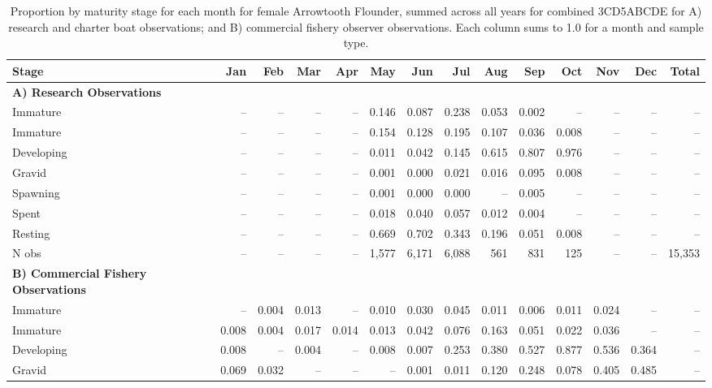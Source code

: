 \begin{table}[b]
\tiny
\centering
\caption{\label{tab:maturityMonth} Proportion by maturity stage for each month for female Arrowtooth Flounder, summed across all years for combined 3CD5ABCDE for A) research and charter boat observations; and B) commercial fishery observer observations. Each column sums to 1.0 for a month and sample type.}
\begin{tabular}{lrrrrrrrrrrrrr}
\hline
Stage      &   Jan &   Feb &   Mar &   Apr &   May &   Jun &   Jul &   Aug &   Sep &   Oct &   Nov &   Dec &  Total \\
\hline
\textbf{A) Research Observations} \\
Immature   &    -- &    -- &    -- &    -- & 0.146 & 0.087 & 0.238 & 0.053 & 0.002 &    -- &    -- &    -- &     -- \\
Immature   &    -- &    -- &    -- &    -- & 0.154 & 0.128 & 0.195 & 0.107 & 0.036 & 0.008 &    -- &    -- &     -- \\
Developing &    -- &    -- &    -- &    -- & 0.011 & 0.042 & 0.145 & 0.615 & 0.807 & 0.976 &    -- &    -- &     -- \\
Gravid     &    -- &    -- &    -- &    -- & 0.001 & 0.000 & 0.021 & 0.016 & 0.095 & 0.008 &    -- &    -- &     -- \\
Spawning   &    -- &    -- &    -- &    -- & 0.001 & 0.000 & 0.000 &    -- & 0.005 &    -- &    -- &    -- &     -- \\
Spent      &    -- &    -- &    -- &    -- & 0.018 & 0.040 & 0.057 & 0.012 & 0.004 &    -- &    -- &    -- &     -- \\
Resting    &    -- &    -- &    -- &    -- & 0.669 & 0.702 & 0.343 & 0.196 & 0.051 & 0.008 &    -- &    -- &     -- \\
N obs      &    -- &    -- &    -- &    -- & 1,577 & 6,171 & 6,088 &   561 &   831 &   125 &    -- &    -- & 15,353 \\
\hline
\textbf{B) Commercial Fishery Observations} \\
Immature   &    -- & 0.004 & 0.013 &    -- & 0.010 & 0.030 & 0.045 & 0.011 & 0.006 & 0.011 & 0.024 &    -- &     -- \\
Immature   & 0.008 & 0.004 & 0.017 & 0.014 & 0.013 & 0.042 & 0.076 & 0.163 & 0.051 & 0.022 & 0.036 &    -- &     -- \\
Developing & 0.008 &    -- & 0.004 &    -- & 0.008 & 0.007 & 0.253 & 0.380 & 0.527 & 0.877 & 0.536 & 0.364 &     -- \\
Gravid     & 0.069 & 0.032 &    -- &    -- &    -- & 0.001 & 0.011 & 0.120 & 0.248 & 0.078 & 0.405 & 0.485 &     -- \\

\end{tabular}
\end{table}
